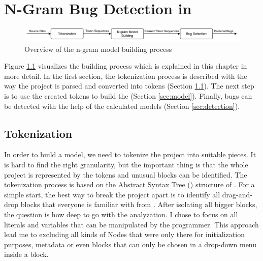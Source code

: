 \chapter{N-Gram Bug Detection in \scratch{}}\label{chap:methods}

\begin{figure}[hbtp]
\centering
\includegraphics[scale=0.75]{images/Overview.pdf}
\caption{Overview of the n-gram model building process}
\label{fig:overview}
\end{figure}

Figure \ref{fig:overview} visualizes the \ngram{} building process which is explained in this chapter in more detail. In the first section, the tokenization process is described with the way the \scratch{} project is parsed and converted into tokens (Section \ref{sec:tokenization}). The next step is to use the created tokens to build the  (Section \ref{sec:model}). Finally, bugs can be detected with the help of the calculated models (Section \ref{sec:detection}).

\section{Tokenization}\label{sec:tokenization}
In order to build a model, we need to tokenize the \scratch{} project into suitable pieces. It is hard to find the right granularity, but the important thing is that the whole project is represented by the tokens and unusual blocks can be identified. The tokenization process is based on the Abstract Syntax Tree (\AST{}) structure of \litterbox{}. For a simple start, the best way to break the project apart is to identify all drag-and-drop blocks that everyone is familiar with from \scratch{}. After isolating all bigger blocks, the question is how deep to go with the analyzation. I chose to focus on all literals and variables that can be manipulated by the \scratch{} programmer. This approach lead me to excluding all kinds of \AST{}Nodes that were only there for initialization purposes, metadata or even blocks that can only be chosen in a drop-down menu inside a block.  

